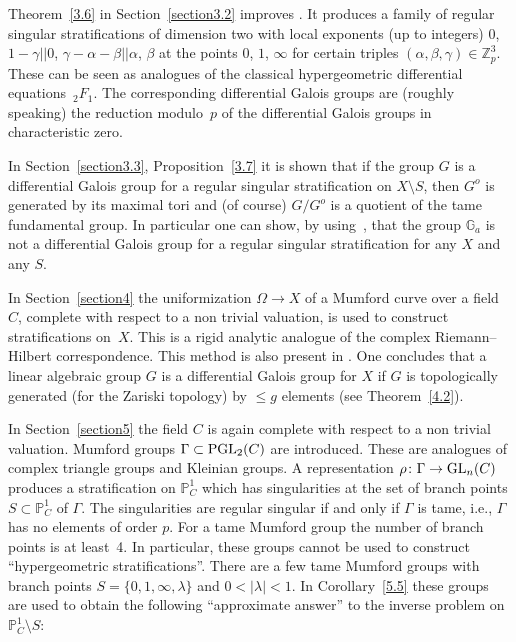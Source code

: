 \documentclass[pdftex]{sigma}
\numberwithin{equation}{section}
\begin{document}
 Theorem~\ref{3.6} in Section~\ref{section3.2} improves \cite[Theorem~8.9]{Ma-vdP1}. It produces a family of regular singular stratifications of dimension two with local exponents (up to integers) $0$, $1-\gamma || 0$, $\gamma -\alpha -\beta || \alpha$, $\beta$ at the points $0$, $1$, $\infty$ for certain triples $(\alpha , \beta , \gamma) \in \mathbb{Z}_p^3$. These can be seen as analogues of the classical hypergeometric differential equations~$_2F_1$. The corresponding differential Galois groups are (roughly speaking) the reduction modulo~$p$ of the differential Galois groups in characteristic zero.

In Section~\ref{section3.3}, Proposition~\ref{3.7} it is shown that if the group $G$ is a differential Galois group for a regular singular stratification on $X\setminus S$, then $G^o$ is generated by its maximal tori and (of course) $G/G^o$ is a quotient of the tame fundamental group. In particular one can show, by using~\cite[Corollary~16]{Sa}, that the group $\mathbb{G}_a$ is not a differential Galois group for a regular singular stratification for any $X$ and any $S$.

In Section~\ref{section4} the uniformization $\Omega \rightarrow X$ of a Mumford curve over a field $C$, complete with respect to a non trivial valuation, is used to construct stratifications on~$X$. This is a rigid analytic analogue of the complex Riemann--Hilbert correspondence. This method is also present in \cite{Sa}. One concludes that
a linear algebraic group $G$ is a differential Galois group for $X$ if $G$ is topologically generated (for the Zariski topology) by $\leq g$ elements (see Theorem~\ref{4.2}).

In Section~\ref{section5} the field $C$ is again complete with respect to a non trivial valuation. Mumford groups $\Gamma\subset {\rm PGL}_2(C)$ are introduced. These are analogues of complex triangle groups and Kleinian groups. A representation $\rho\colon \Gamma \rightarrow {\rm GL}_n(C)$ produces a stratification on $\mathbb{P}^1_C$ which has
singularities at the set of branch points $S\subset \mathbb{P}^1_C$ of $\Gamma$. The singularities are regular singular if and only if $\Gamma$ is tame, i.e., $\Gamma$ has no elements of order $p$. For a tame Mumford group the number of branch points is at least~4. In particular, these groups cannot be used to construct ``hypergeometric stratifications''. There are a few tame Mumford groups with branch points $S=\{0,1,\infty ,\lambda \}$ and $0<|\lambda |<1$. In Corollary~\ref{5.5} these groups are used to obtain the following ``approximate answer'' to the inverse problem on $\mathbb{P}_C^1\setminus S$:
\end{document}
